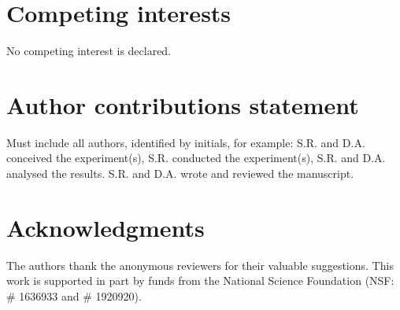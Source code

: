 \documentclass[unnumsec,webpdf,contemporary,large]{oup-authoring-template}%
\theoremstyle{thmstyleone}%
\theoremstyle{thmstyletwo}%
\theoremstyle{thmstylethree}%
\begin{document}
\section{Competing interests}
No competing interest is declared.

\section{Author contributions statement}

Must include all authors, identified by initials, for example:
S.R. and D.A. conceived the experiment(s),  S.R. conducted the experiment(s), S.R. and D.A. analysed the results.  S.R. and D.A. wrote and reviewed the manuscript.

\section{Acknowledgments}
The authors thank the anonymous reviewers for their valuable suggestions. This work is supported in part by funds from the National Science Foundation (NSF: \# 1636933 and \# 1920920).






%
%
\end{document}
